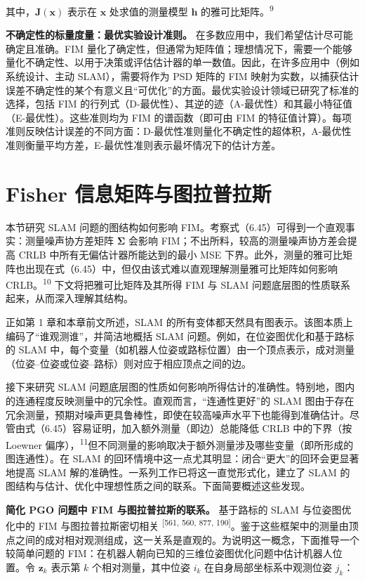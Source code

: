 其中，$\mathbf { J } ( \pmb{x} )$ 表示在 $\pmb{x}$ 处求值的测量模型 $\pmb{h}$ 的雅可比矩阵。\textsuperscript{9}

\textbf{不确定性的标量度量：最优实验设计准则。} 在多数应用中，我们希望估计尽可能确定且准确。FIM 量化了确定性，但通常为矩阵值；理想情况下，需要一个能够量化不确定性、以用于决策或评估估计器的单一数值。因此，在许多应用中（例如系统设计、主动 SLAM），需要将作为 PSD 矩阵的 FIM 映射为实数，以捕获估计误差不确定性的某个有意义且“可优化”的方面。最优实验设计领域已研究了标准的选择，包括 FIM 的行列式（D-最优性）、其逆的迹（A-最优性）和其最小特征值（E-最优性）。这些准则均为 FIM 的谱函数（即可由 FIM 的特征值计算）。每项准则反映估计误差的不同方面：D-最优性准则量化不确定性的超体积，A-最优性准则衡量平均方差，E-最优性准则表示最坏情况下的估计方差。

\section{Fisher 信息矩阵与图拉普拉斯}

本节研究 SLAM 问题的图结构如何影响 FIM。考察式（6.45）可得到一个直观事实：测量噪声协方差矩阵 $\pmb{\Sigma}$ 会影响 FIM；不出所料，较高的测量噪声协方差会提高 CRLB 中所有无偏估计器所能达到的最小 MSE 下界。此外，测量的雅可比矩阵也出现在式（6.45）中，但仅由该式难以直观理解测量雅可比矩阵如何影响 CRLB。\textsuperscript{10} 下文将把雅可比矩阵及其所得 FIM 与 SLAM 问题底层图的性质联系起来，从而深入理解其结构。

正如第 1 章和本章前文所述，SLAM 的所有变体都天然具有图表示。该图本质上编码了“谁观测谁”，并简洁地概括 SLAM 问题。例如，在位姿图优化和基于路标的 SLAM 中，每个变量（如机器人位姿或路标位置）由一个顶点表示，成对测量（位姿--位姿或位姿--路标）则对应于相应顶点之间的边。

接下来研究 SLAM 问题底层图的性质如何影响所得估计的准确性。特别地，图内的连通程度反映测量中的冗余性。直观而言，“连通性更好”的 SLAM 图由于存在冗余测量，预期对噪声更具鲁棒性，即使在较高噪声水平下也能得到准确估计。尽管由式（6.45）容易证明，加入额外测量（即边）总能降低 CRLB 中的下界（按 Loewner 偏序），\textsuperscript{11}但不同测量的影响取决于额外测量涉及哪些变量（即所形成的图连通性）。在 SLAM 的回环情境中这一点尤其明显：闭合“更大”的回环会更显著地提高 SLAM 解的准确性。一系列工作已将这一直觉形式化，建立了 SLAM 的图结构与估计、优化中理想性质之间的联系。下面简要概述这些发现。

\textbf{简化 PGO 问题中 FIM 与图拉普拉斯的联系。} 基于路标的 SLAM 与位姿图优化中的 FIM 与图拉普拉斯密切相关 \textsuperscript{[561, 560, 877, 190]}。鉴于这些框架中的测量由顶点之间的成对相对观测组成，这一关系是直观的。为说明这一概念，下面推导一个较简单问题的 FIM：在机器人朝向已知的三维位姿图优化问题中估计机器人位置。令 $\pmb{z} _ { k }$ 表示第 $k$ 个相对测量，其中位姿 $i _ { k }$ 在自身局部坐标系中观测位姿 $j _ { k }$：


